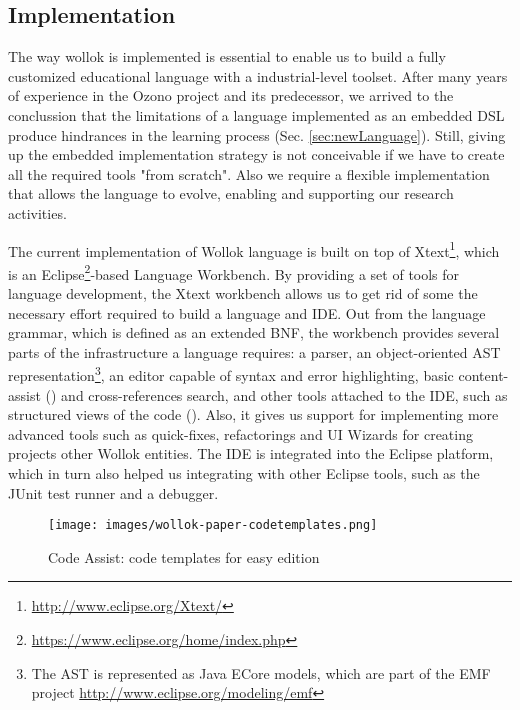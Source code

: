 \subsection{Implementation}
\label{sec:implementation}

The way wollok is implemented is essential to enable us to build a fully customized educational language with a industrial-level toolset.
After many years of experience in the Ozono project and its predecessor, we arrived to the conclussion that
the limitations of a language implemented as an embedded DSL produce hindrances in the learning process (\cf Sec. \ref{sec:newLanguage}).
Still, giving up the embedded implementation strategy is not conceivable if we have to create all the required tools "from scratch".
Also we require a flexible implementation that allows the language to evolve, enabling and supporting our research activities.

The current implementation of Wollok language is built on top of Xtext\footnote{\url{http://www.eclipse.org/Xtext/}}, 
which is an Eclipse\footnote{\url{https://www.eclipse.org/home/index.php}}-based Language Workbench\cite{fowler2005language}.
By providing a set of tools for language development, the Xtext workbench allows us to get rid of some the necessary effort required to build a language and IDE.
Out from the language grammar, which is defined as an extended BNF, the workbench provides several parts of the infrastructure a language requires: 
a parser, an object-oriented AST representation\footnote{The AST is represented as Java ECore models, which are part of the EMF project \url{http://www.eclipse.org/modeling/emf}}, 
an editor capable of syntax and error highlighting, basic content-assist (\cf {}) and cross-references search, 
and other tools attached to the IDE, such as structured views of the code (\cf {}).
Also, it gives us support for implementing more advanced tools such as quick-fixes, refactorings and UI Wizards for creating projects other Wollok entities.
The IDE is integrated into the Eclipse platform, which in turn also helped us integrating with other Eclipse tools, such as the JUnit test runner and a debugger.

\begin{figure}[ht]
    \centering
	\texttt{[image: images/wollok-paper-codetemplates.png]}
    \caption{Code Assist: code templates for easy edition}
    \label{fig:codetemplates.png}
\end{figure}

